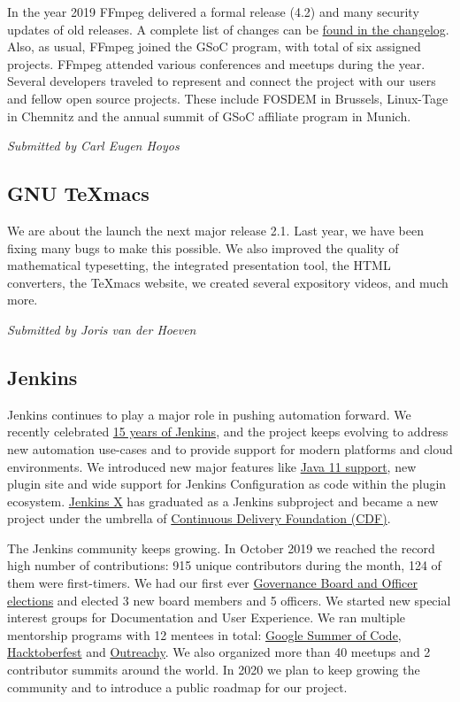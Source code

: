 \documentclass[a4paper]{report}
\begin{document}
In the year 2019 FFmpeg delivered a formal release (4.2) and many
security updates of old releases. A complete list of changes can be
\href{https://git.ffmpeg.org/gitweb/ffmpeg.git/blob/HEAD:/Changelog}{found
in the changelog}.  Also, as usual, FFmpeg joined the GSoC program, with
total of six assigned projects.  FFmpeg attended various conferences and
meetups during the year. Several developers traveled to represent and
connect the project with our users and fellow open source projects.
These include FOSDEM in Brussels, Linux-Tage in Chemnitz and the annual
summit of GSoC affiliate program in Munich.

{\em Submitted by Carl Eugen Hoyos}

\subsection{GNU TeXmacs}

We are about the launch the next major release 2.1.  Last year, we have
been fixing many bugs to make this possible.  We also improved the
quality of mathematical typesetting, the integrated presentation tool,
the HTML converters, the TeXmacs website, we created several expository
videos, and much more.

{\em Submitted by Joris van der Hoeven}

\subsection{Jenkins}

Jenkins continues to play a major role in pushing automation forward. We
recently celebrated
\href{https://cd.foundation/announcement/2019/08/14/jenkins-celebrates-15-years/}{15
years of Jenkins}, and the project keeps evolving to address new
automation use-cases and to provide support for modern platforms and
cloud environments. We introduced new major features like
\href{https://jenkins.io/blog/2019/03/11/let-s-celebrate-java-11-support/}{Java
11 support}, new plugin site and wide support for Jenkins Configuration
as code within the plugin ecosystem.
\href{https://jenkins-x.io/}{Jenkins X} has graduated as a Jenkins
subproject and became a new project under the umbrella of
\href{https://cd.foundation/}{Continuous Delivery Foundation (CDF)}.

The Jenkins community keeps growing. In October 2019 we reached the
record high number of contributions: 915 unique contributors during the
month, 124 of them were first-timers. We had our first ever
\href{https://jenkins.io/blog/2019/12/16/board-election-results/}{Governance
Board and Officer elections} and elected 3 new board members and 5
officers. We started new special interest groups for Documentation and
User Experience. We ran multiple mentorship programs with 12 mentees in
total: \href{https://jenkins.io/projects/gsoc/2019/}{Google Summer of
Code}, \href{https://jenkins.io/events/hacktoberfest/}{Hacktoberfest}
and
\href{https://jenkins.io/blog/2019/09/23/outreachy-audit-log-release/}{Outreachy}.
We also organized more than 40 meetups and 2 contributor summits around
the world. In 2020 we plan to keep growing the community and to
introduce a public roadmap for our project.
\end{document}
